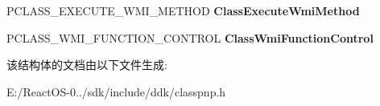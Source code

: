 \begin{DoxyCompactItemize}
\item 
\mbox{\label{struct___c_l_a_s_s___w_m_i___i_n_f_o_ad760490b0c9045afcdd2b38472c731d5}} 
P\+C\+L\+A\+S\+S\+\_\+\+E\+X\+E\+C\+U\+T\+E\+\_\+\+W\+M\+I\+\_\+\+M\+E\+T\+H\+OD {\bfseries Class\+Execute\+Wmi\+Method}
\item 
\mbox{\label{struct___c_l_a_s_s___w_m_i___i_n_f_o_a60afe1016eddbfcc41eaab90982fe5e8}} 
P\+C\+L\+A\+S\+S\+\_\+\+W\+M\+I\+\_\+\+F\+U\+N\+C\+T\+I\+O\+N\+\_\+\+C\+O\+N\+T\+R\+OL {\bfseries Class\+Wmi\+Function\+Control}
\end{DoxyCompactItemize}


该结构体的文档由以下文件生成\+:\begin{DoxyCompactItemize}
\item 
E\+:/\+React\+O\+S-\/0../sdk/include/ddk/classpnp.\+h\end{DoxyCompactItemize}
